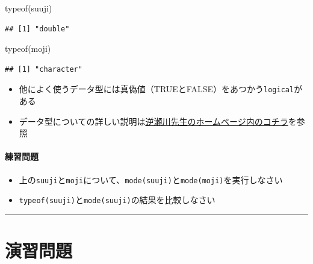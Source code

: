 \documentclass[
]{book}
\newenvironment{Shaded}{\begin{snugshade}}{\end{snugshade}}
\newcommand{\FunctionTok}[1]{\textcolor[rgb]{0.00,0.00,0.00}{#1}}
\newcommand{\NormalTok}[1]{#1}
\providecommand{\tightlist}{%
  \setlength{\itemsep}{0pt}\setlength{\parskip}{0pt}}
\begin{document}
\begin{Shaded}
\begin{Highlighting}[]
\FunctionTok{typeof}\NormalTok{(suuji)}
\end{Highlighting}
\end{Shaded}

\begin{verbatim}
## [1] "double"
\end{verbatim}

\begin{Shaded}
\begin{Highlighting}[]
\FunctionTok{typeof}\NormalTok{(moji)}
\end{Highlighting}
\end{Shaded}

\begin{verbatim}
## [1] "character"
\end{verbatim}

\begin{itemize}
\tightlist
\item
  他によく使うデータ型には真偽値（TRUEとFALSE）をあつかう\texttt{logical}がある
\item
  データ型についての詳しい説明は\href{http://www.f.waseda.jp/sakas/R/Rdata.html}{逆瀬川先生のホームページ内のコチラ}を参照
\end{itemize}

\hypertarget{ux7df4ux7fd2ux554fux984c-1}{%
\paragraph*{練習問題}\label{ux7df4ux7fd2ux554fux984c-1}}

\begin{itemize}
\tightlist
\item
  上の\texttt{suuji}と\texttt{moji}について、\texttt{mode(suuji)}と\texttt{mode(moji)}を実行しなさい
\item
  \texttt{typeof(suuji)}と\texttt{mode(suuji)}の結果を比較しなさい
\end{itemize}

\begin{center}\rule{0.5\linewidth}{0.5pt}\end{center}

\hypertarget{ux6f14ux7fd2ux554fux984c-1}{%
\section{演習問題}\label{ux6f14ux7fd2ux554fux984c-1}}
\end{document}
